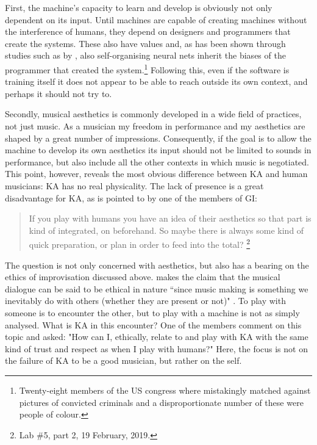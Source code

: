 \documentclass[11pt]{article}
\begin{document}
First, the machine's capacity to learn and develop is obviously not
only dependent on its input. Until machines are capable of creating
machines without the interference of humans, they depend on designers
and programmers that create the systems. These also have values and,
as has been shown through studies such as by \citet{snow2018}, also
self-organising neural nets inherit the biases of the programmer that
created the system.\footnote{Twenty-eight members of the US congress
    where mistakingly matched against pictures of convicted criminals
    and a disproportionate number of these were people of colour.}
Following this, even if the software is training itself it does not
appear to be able to reach outside its own context, and perhaps it
should not try to.

Secondly, musical aesthetics is commonly developed in a wide field of
practices, not just music. As a musician my freedom in performance and
my aesthetics are shaped by a great number of
impressions. Consequently, if the goal is to allow the machine to
develop its own aesthetics its input should not be limited to sounds
in performance, but also include all the other contexts in which music
is negotiated. This point, however, reveals the most obvious
difference between KA and human musicians: KA has no real
physicality. The lack of presence is a great disadvantage for KA, as
is pointed to by one of the members of GI:
\begin{quote}
If you play with humans you have an idea of their aesthetics so that
part is kind of integrated, on beforehand. So maybe there is always
some kind of quick preparation, or plan in order to feed into the
total? \footnote{Lab \#5, part 2, 19 February, 2019.}
\end{quote}
The question is not only concerned with aesthetics, but also has a
bearing on the ethics of improvisation discussed
above. \citeauthor{benson03} makes the claim that the musical dialogue
can be said to be ethical in nature “since music making is something
we inevitably do with others (whether they are present or not)"
\citep{benson03}. To play with someone is to encounter the other, but
to play with a machine is not as simply analysed. What is KA in this
encounter? One of the members comment on this topic and asked: "How
can I, ethically, relate to and play with KA with the same kind of
trust and respect as when I play with humans?"
\citep[p. 4]{endresen2018} Here, the focus is not on the failure of KA
to be a good musician, but rather on the self.
\end{document}
